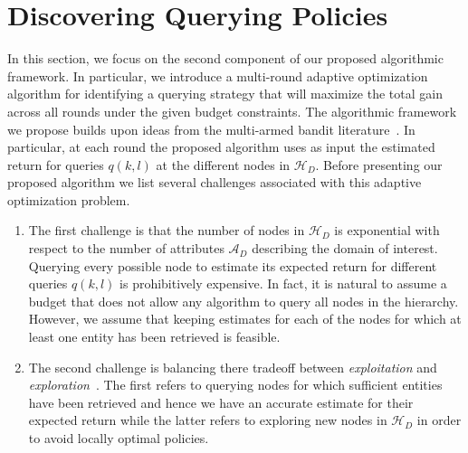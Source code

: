 \documentclass{vldb}
\newcommand{\attributes}{\mathcal{A}_D}
\newcommand{\hierarchy}{\mathcal{H}_D}
\begin{document}
%
%

\section{Discovering Querying Policies}
\label{sec:solving}
In this section, we focus on the second component of our proposed algorithmic framework. In particular, we introduce a multi-round adaptive optimization algorithm for identifying a querying strategy that will maximize the total gain across all rounds under the given budget constraints. The algorithmic framework we propose builds upon ideas from the multi-armed bandit literature~\cite{Auer:2003,EvenDar06actionelimination}. In particular,  at each round the proposed algorithm uses as input the estimated return for queries $q(k,l)$ at the different nodes in $\hierarchy$. Before presenting our proposed algorithm we list several challenges associated with this adaptive optimization problem.

\begin{enumerate}
\item The first challenge is that the number of nodes in $\hierarchy$ is exponential with respect to the number of attributes $\attributes$ describing the domain of interest. Querying every possible node to estimate its expected return for different queries $q(k,l)$ is prohibitively expensive. In fact, it is natural to assume a budget that does not allow any algorithm to query all nodes in the hierarchy. However, we assume that keeping estimates for each of the nodes for which at least one entity has been retrieved is feasible. 
\item The second challenge is balancing there tradeoff between {\em exploitation} and {\em exploration}~\cite{Auer:2003}. The first refers to querying nodes for which sufficient entities have been retrieved and hence we have an accurate estimate for their expected return while the latter refers to exploring new nodes in $\hierarchy$ in order to avoid locally optimal policies.
\end{enumerate}
\end{document}
